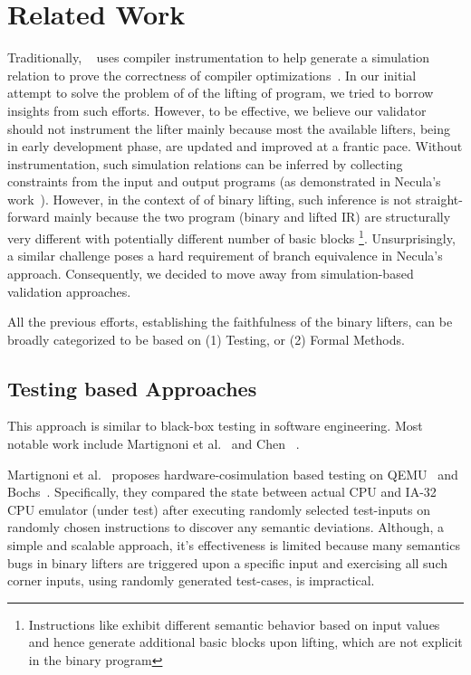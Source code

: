 \section{Related Work}\label{sec:RW}

Traditionally, \tv~\cite{Pnueli:1998} uses compiler instrumentation to help
generate a simulation relation to prove the correctness of compiler
optimizations~\cite{Rival:2004,Kanade:2006}. In our initial attempt to solve the
problem of \tv of the lifting of \ISA program, we tried to borrow insights
from such efforts. However, to be effective,  we believe our validator should
not instrument the lifter mainly because most the available lifters, being in
early development phase,  are updated and improved at a frantic pace. Without 
instrumentation, such simulation relations can be inferred by collecting
constraints from the input and output programs (as demonstrated in Necula's 
work~\cite{Necula:2000}). However, in the context of
\tv of binary lifting, such inference is not straight-forward  mainly because
the two program (\ISA binary and lifted IR) are structurally very different
with potentially different number of basic blocks  
% 
\footnote{Instructions like  exhibit different semantic behavior
    based on input values and hence generate additional basic blocks upon 
    lifting,
    which are not explicit in the binary program}.
%
Unsurprisingly, a similar challenge poses a hard requirement of branch 
equivalence in Necula's approach.  
%
Consequently, we decided to move away from simulation-based
validation approaches.

 All the previous efforts, establishing the faithfulness of the binary 
 lifters,  can be broadly categorized to be based on (1)
  Testing, or (2) Formal Methods.

\subsection{Testing based Approaches}
This approach is similar to black-box testing in software engineering. Most
notable work include Martignoni et
al.~\cite{Martignoni:ISSTA2009, Martignoni:ISSTA2010,Martignoni:ASPLOS2012} and
Chen \etal~\cite{CLSS2015}.


Martignoni et al.~\cite{Martignoni:ISSTA2009, Martignoni:ISSTA2010} proposes
hardware-cosimulation based testing on QEMU~\cite{QEMU:USENIX05} and
Bochs~\cite{Bochs1996}.  Specifically, they compared the state between actual
CPU and  IA-32 CPU emulator (under test) after executing randomly selected
test-inputs on randomly chosen instructions  to discover any semantic
deviations. Although, a simple and scalable approach, it's effectiveness is
limited because many semantics bugs in binary lifters are triggered upon a
specific input and exercising all such corner inputs, using randomly generated
test-cases, is impractical.

